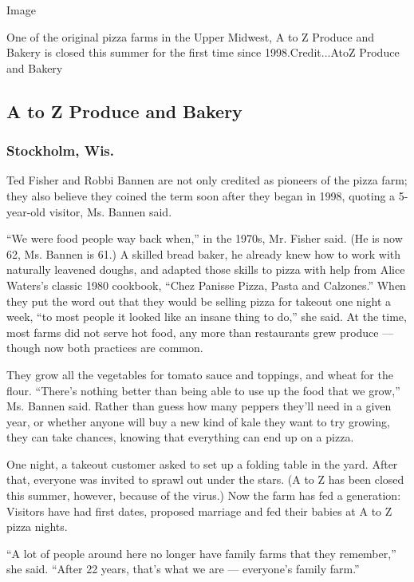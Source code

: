 Image

One of the original pizza farms in the Upper Midwest, A to Z Produce and
Bakery is closed this summer for the first time since 1998.Credit...AtoZ
Produce and Bakery

\hypertarget{a-to-z-produce-and-bakery}{%
\subsection{A to Z Produce and Bakery}\label{a-to-z-produce-and-bakery}}

\hypertarget{stockholm-wis}{%
\subsubsection{Stockholm, Wis.}\label{stockholm-wis}}

Ted Fisher and Robbi Bannen are not only credited as pioneers of the
pizza farm; they also believe they coined the term soon after they began
in 1998, quoting a 5-year-old visitor, Ms. Bannen said.

``We were food people way back when,'' in the 1970s, Mr. Fisher said.
(He is now 62, Ms. Bannen is 61.) A skilled bread baker, he already knew
how to work with naturally leavened doughs, and adapted those skills to
pizza with help from Alice Waters's classic 1980 cookbook, ``Chez
Panisse Pizza, Pasta and Calzones.'' When they put the word out that
they would be selling pizza for takeout one night a week, ``to most
people it looked like an insane thing to do,'' she said. At the time,
most farms did not serve hot food, any more than restaurants grew
produce --- though now both practices are common.

They grow all the vegetables for tomato sauce and toppings, and wheat
for the flour. ``There's nothing better than being able to use up the
food that we grow,'' Ms. Bannen said. Rather than guess how many peppers
they'll need in a given year, or whether anyone will buy a new kind of
kale they want to try growing, they can take chances, knowing that
everything can end up on a pizza.

One night, a takeout customer asked to set up a folding table in the
yard. After that, everyone was invited to sprawl out under the stars. (A
to Z has been closed this summer, however, because of the virus.) Now
the farm has fed a generation: Visitors have had first dates, proposed
marriage and fed their babies at A to Z pizza nights.

``A lot of people around here no longer have family farms that they
remember,'' she said. ``After 22 years, that's what we are ---
everyone's family farm.''

